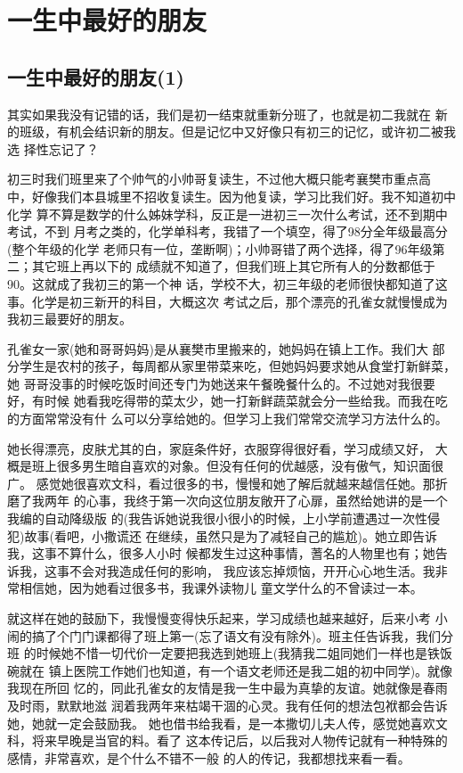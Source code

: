 \documentclass[12pt]{book}
\begin{document}
\section{一生中最好的朋友}
\label{sec-2-6}
\subsection{一生中最好的朋友(1)}
\label{sec-2-6-1}
        其实如果我没有记错的话，我们是初一结束就重新分班了，也就是初二我就在
新的班级，有机会结识新的朋友。但是记忆中又好像只有初三的记忆，或许初二被我选
择性忘记了？

        初三时我们班里来了个帅气的小帅哥复读生，不过他大概只能考襄樊市重点高
中，好像我们本县城里不招收复读生。因为他复读，学习比我们好。我不知道初中化学
算不算是数学的什么姊妹学科，反正是一进初三一次什么考试，还不到期中考试，不到
月考之类的，化学单科考，我错了一个填空，得了98分全年级最高分(整个年级的化学
老师只有一位，垄断啊)；小帅哥错了两个选择，得了96年级第二；其它班上再以下的
成绩就不知道了，但我们班上其它所有人的分数都低于90。这就成了我初三的第一个神
话，学校不大，初三年级的老师很快都知道了这事。化学是初三新开的科目，大概这次
考试之后，那个漂亮的孔雀女就慢慢成为我初三最要好的朋友。

        孔雀女一家(她和哥哥妈妈)是从襄樊市里搬来的，她妈妈在镇上工作。我们大
部分学生是农村的孩子，每周都从家里带菜来吃，但她妈妈要求她从食堂打新鲜菜，她
哥哥没事的时候吃饭时间还专门为她送来午餐晚餐什么的。不过她对我很要好，有时候
她看我吃得带的菜太少，她一打新鲜蔬菜就会分一些给我。而我在吃的方面常常没有什
么可以分享给她的。但学习上我们常常交流学习方法什么的。

        她长得漂亮，皮肤尤其的白，家庭条件好，衣服穿得很好看，学习成绩又好，
大概是班上很多男生暗自喜欢的对象。但没有任何的优越感，没有傲气，知识面很广。
感觉她很喜欢文科，看过很多的书，慢慢和她了解后就越来越信任她。那折磨了我两年
的心事，我终于第一次向这位朋友敞开了心扉，虽然给她讲的是一个我编的自动降级版
的(我告诉她说我很小很小的时候，上小学前遭遇过一次性侵犯)故事(看吧，小撒谎还
在继续，虽然只是为了减轻自己的尴尬)。她立即告诉我，这事不算什么，很多人小时
候都发生过这种事情，蓍名的人物里也有；她告诉我，这事不会对我造成任何的影响，
我应该忘掉烦恼，开开心心地生活。我非常相信她，因为她看过很多书，我课外读物儿
童文学什么的不曾读过一本。

        就这样在她的鼓励下，我慢慢变得快乐起来，学习成绩也越来越好，后来小考
小闹的搞了个门门课都得了班上第一(忘了语文有没有除外)。班主任告诉我，我们分班
的时候她不惜一切代价一定要把我选到她班上(我猜我二姐同她们一样也是铁饭碗就在
镇上医院工作她们也知道，有一个语文老师还是我二姐的初中同学)。就像我现在所回
忆的，同此孔雀女的友情是我一生中最为真挚的友谊。她就像是春雨及时雨，默默地滋
润着我两年来枯竭干涸的心灵。我有任何的想法包袱都会告诉她，她就一定会鼓励我。
她也借书给我看，是一本撒切儿夫人传，感觉她喜欢文科，将来早晚是当官的料。看了
这本传记后，以后我对人物传记就有一种特殊的感情，非常喜欢，是个什么不错不一般
的人的传记，我都想找来看一看。
\end{document}
